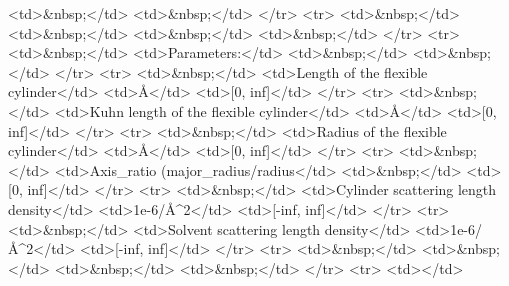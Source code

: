 \textless{}td\textgreater{}\&nbsp;\textless{}/td\textgreater{} \textless{}td\textgreater{}\&nbsp;\textless{}/td\textgreater{} \textless{}/tr\textgreater{} \textless{}tr\textgreater{} \textless{}td\textgreater{}\&nbsp;\textless{}/td\textgreater{} \textless{}td\textgreater{}\&nbsp;\textless{}/td\textgreater{} \textless{}td\textgreater{}\&nbsp;\textless{}/td\textgreater{} \textless{}td\textgreater{}\&nbsp;\textless{}/td\textgreater{} \textless{}/tr\textgreater{} \textless{}tr\textgreater{} \textless{}td\textgreater{}\&nbsp;\textless{}/td\textgreater{} \textless{}td\textgreater{}Parameters:\textless{}/td\textgreater{} \textless{}td\textgreater{}\&nbsp;\textless{}/td\textgreater{} \textless{}td\textgreater{}\&nbsp;\textless{}/td\textgreater{} \textless{}/tr\textgreater{} \textless{}tr\textgreater{} \textless{}td\textgreater{}\&nbsp;\textless{}/td\textgreater{} \textless{}td\textgreater{}Length of the flexible cylinder\textless{}/td\textgreater{} \textless{}td\textgreater{}\AA{}\textless{}/td\textgreater{} \textless{}td\textgreater{}[0, inf]\textless{}/td\textgreater{} \textless{}/tr\textgreater{} \textless{}tr\textgreater{} \textless{}td\textgreater{}\&nbsp;\textless{}/td\textgreater{} \textless{}td\textgreater{}Kuhn length of the flexible cylinder\textless{}/td\textgreater{} \textless{}td\textgreater{}\AA{}\textless{}/td\textgreater{} \textless{}td\textgreater{}[0, inf]\textless{}/td\textgreater{} \textless{}/tr\textgreater{} \textless{}tr\textgreater{} \textless{}td\textgreater{}\&nbsp;\textless{}/td\textgreater{} \textless{}td\textgreater{}Radius of the flexible cylinder\textless{}/td\textgreater{} \textless{}td\textgreater{}\AA{}\textless{}/td\textgreater{} \textless{}td\textgreater{}[0, inf]\textless{}/td\textgreater{} \textless{}/tr\textgreater{} \textless{}tr\textgreater{} \textless{}td\textgreater{}\&nbsp;\textless{}/td\textgreater{} \textless{}td\textgreater{}Axis\_ratio (major\_radius/radius\textless{}/td\textgreater{} \textless{}td\textgreater{}\&nbsp;\textless{}/td\textgreater{} \textless{}td\textgreater{}[0, inf]\textless{}/td\textgreater{} \textless{}/tr\textgreater{} \textless{}tr\textgreater{} \textless{}td\textgreater{}\&nbsp;\textless{}/td\textgreater{} \textless{}td\textgreater{}Cylinder scattering length density\textless{}/td\textgreater{} \textless{}td\textgreater{}1e-6/\AA{}\textasciicircum{}2\textless{}/td\textgreater{} \textless{}td\textgreater{}[-inf, inf]\textless{}/td\textgreater{} \textless{}/tr\textgreater{} \textless{}tr\textgreater{} \textless{}td\textgreater{}\&nbsp;\textless{}/td\textgreater{} \textless{}td\textgreater{}Solvent scattering length density\textless{}/td\textgreater{} \textless{}td\textgreater{}1e-6/\AA{}\textasciicircum{}2\textless{}/td\textgreater{} \textless{}td\textgreater{}[-inf, inf]\textless{}/td\textgreater{} \textless{}/tr\textgreater{} \textless{}tr\textgreater{} \textless{}td\textgreater{}\&nbsp;\textless{}/td\textgreater{} \textless{}td\textgreater{}\&nbsp;\textless{}/td\textgreater{} \textless{}td\textgreater{}\&nbsp;\textless{}/td\textgreater{} \textless{}td\textgreater{}\&nbsp;\textless{}/td\textgreater{} \textless{}/tr\textgreater{} \textless{}tr\textgreater{} \textless{}td\textgreater{}\textless{}/td\textgreater{}

